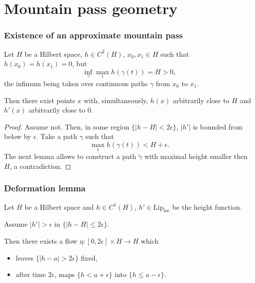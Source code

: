\documentclass[9pt, english]{beamer}
\theoremstyle{definition}
\begin{document}
\section{Mountain pass geometry}

\begin{frame}
\frametitle{Existence of an approximate mountain pass}
\begin{theorem}
Let $H$ be a Hilbert space, $h \in C^2(H)$, $x_0,x_1 \in H$ such
that $h(x_0) = h(x_1) = 0$, but
\begin{equation}
\inf_\gamma \max_t h(\gamma(t)) = H > 0,
\end{equation}
the infimum being taken over continuous paths $\gamma$ from $x_0$ to
$x_1$.

Then there exist points $x$ with, simultaneously, $h(x)$ arbitrarily
close to $H$ and $h'(x)$ arbitrarily close to $0$.
\end{theorem}
\pause
\begin{proof}
Assume not. Then, in some region $\{ |h-H| < 2 \epsilon \}$, $|h'|$
is bounded from below by $\epsilon$. Take a path $\gamma$ such that
\[
\max_t h(\gamma(t)) < H + \epsilon.
\]
The next lemma allows to construct a path $\tilde\gamma$ with
maximal height smaller then $H$, a contradiction.
\end{proof}
\end{frame}

\begin{frame}
\frametitle{Deformation lemma}
\begin{lemma}
Let $H$ be a Hilbert space and $h \in C^1 (H)$, $h' \in
\text{Lip}_\text{loc}$ be the height function.

Assume $|h'|>\epsilon$ in $\{ |h - H| \leq 2 \epsilon \}$.

Then there exists a flow $\eta : [0,2 \epsilon] \times H \to H$
which
\begin{itemize}
\item leaves $\{ |h - a| > 2 \epsilon \}$ fixed,
\item after time $2\epsilon$, maps $\{ h < a + \epsilon\}$ into $\{ h \leq a - \epsilon \}$.
\end{itemize}
\end{lemma}
\end{frame}
\end{document}
